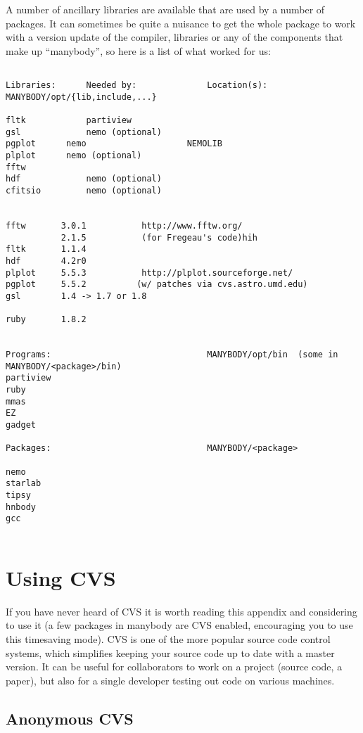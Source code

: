 \begin{itemize}
\begin{itemize}
A number of ancillary libraries are available that are used by a number
of packages. It can sometimes be quite a nuisance to get the whole package
to work with a version update of the compiler, libraries or any of the
components that make up ``manybody'', so here is a list of what worked
for us:

\footnotesize\begin{verbatim}

Libraries:      Needed by:              Location(s): MANYBODY/opt/{lib,include,...}

fltk            partiview
gsl             nemo (optional)
pgplot		nemo                    NEMOLIB
plplot		nemo (optional)
fftw            
hdf             nemo (optional)
cfitsio         nemo (optional)


fftw       3.0.1           http://www.fftw.org/ 
           2.1.5           (for Fregeau's code)hih
fltk	   1.1.4
hdf        4.2r0
plplot     5.5.3           http://plplot.sourceforge.net/   
pgplot     5.5.2          (w/ patches via cvs.astro.umd.edu)
gsl        1.4 -> 1.7 or 1.8

ruby	   1.8.2


Programs:                               MANYBODY/opt/bin  (some in MANYBODY/<package>/bin)
partiview
ruby
mmas
EZ
gadget

Packages:                               MANYBODY/<package>

nemo
starlab
tipsy
hnbody
gcc


\end{verbatim}\normalsize



\chapter                {Using CVS}

If you have never heard of CVS it is worth reading
this appendix and considering to use it (a few packages
in manybody are CVS enabled, encouraging you to use this timesaving mode).
CVS is one of the more popular
source code control systems, which simplifies keeping your source code
up to date with a master version. It can be useful for collaborators
to work on a project (source code, a paper), but also for a single
developer testing out code on various machines.

\section{Anonymous CVS}


\end{itemize}
\end{itemize}
